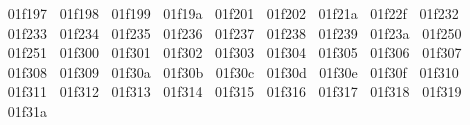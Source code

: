 {  ^^^^^^01f197%
  ^^^^^^01f198%
  ^^^^^^01f199%
  ^^^^^^01f19a%
  ^^^^^^01f201%
  ^^^^^^01f202%
  ^^^^^^01f21a%
  ^^^^^^01f22f%
  ^^^^^^01f232%
  ^^^^^^01f233%
  ^^^^^^01f234%
  ^^^^^^01f235%
  ^^^^^^01f236%
  ^^^^^^01f237%
  ^^^^^^01f238%
  ^^^^^^01f239%
  ^^^^^^01f23a%
  ^^^^^^01f250%
  ^^^^^^01f251%
  ^^^^^^01f300%
  ^^^^^^01f301%
  ^^^^^^01f302%
  ^^^^^^01f303%
  ^^^^^^01f304%
  ^^^^^^01f305%
  ^^^^^^01f306%
  ^^^^^^01f307%
  ^^^^^^01f308%
  ^^^^^^01f309%
  ^^^^^^01f30a%
  ^^^^^^01f30b%
  ^^^^^^01f30c%
  ^^^^^^01f30d%
  ^^^^^^01f30e%
  ^^^^^^01f30f%
  ^^^^^^01f310%
  ^^^^^^01f311%
  ^^^^^^01f312%
  ^^^^^^01f313%
  ^^^^^^01f314%
  ^^^^^^01f315%
  ^^^^^^01f316%
  ^^^^^^01f317%
  ^^^^^^01f318%
  ^^^^^^01f319%
  ^^^^^^01f31a%
}
